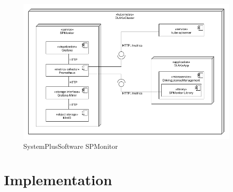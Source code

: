 \begin{figure}
	\centering
	\includegraphics[width=\textwidth]{figures/sps_spmonitor.png}
	\caption{SystemPlusSoftware SPMonitor}
	\label{fig:sps_spmonitor}
\end{figure}

\section{Implementation}